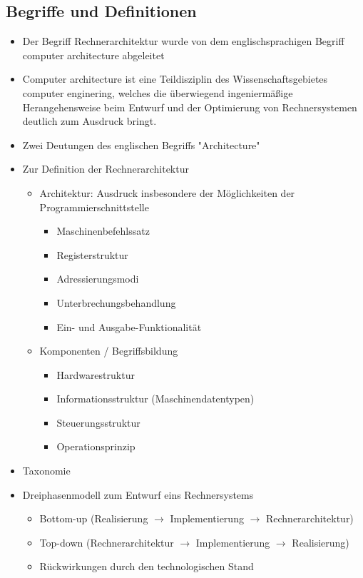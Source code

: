 \subsection{Begriffe und Definitionen}
\begin{itemize}
	\item Der Begriff Rechnerarchitektur wurde von dem englischsprachigen Begriff computer architecture abgeleitet
	\item Computer architecture ist eine Teildisziplin des Wissenschaftsgebietes computer enginering, welches die überwiegend ingeniermäßige Herangehensweise beim Entwurf und der Optimierung von Rechnersystemen deutlich zum Ausdruck bringt.
	\item Zwei Deutungen des englischen Begriffs "Architecture"
	\item Zur Definition der Rechnerarchitektur
	\begin{itemize}
		\item Architektur: Ausdruck insbesondere der Möglichkeiten der Programmierschnittstelle
		\begin{itemize}
			\item Maschinenbefehlssatz
			\item Registerstruktur
			\item Adressierungsmodi
			\item Unterbrechungsbehandlung
			\item Ein- und Ausgabe-Funktionalität
		\end{itemize}
		\item Komponenten / Begriffsbildung
		\begin{itemize}
			\item Hardwarestruktur
			\item Informationsstruktur (Maschinendatentypen)
			\item Steuerungsstruktur
			\item Operationsprinzip
		\end{itemize}
	\end{itemize}
	\item Taxonomie
	\item Dreiphasenmodell zum Entwurf eins Rechnersystems
	\begin{itemize}
		\item Bottom-up (Realisierung \(\to\) Implementierung \(\to\) Rechnerarchitektur)
		\item Top-down (Rechnerarchitektur \(\to\) Implementierung \(\to\) Realisierung)
		\item Rückwirkungen durch den technologischen Stand						\end{itemize}
\end{itemize}

